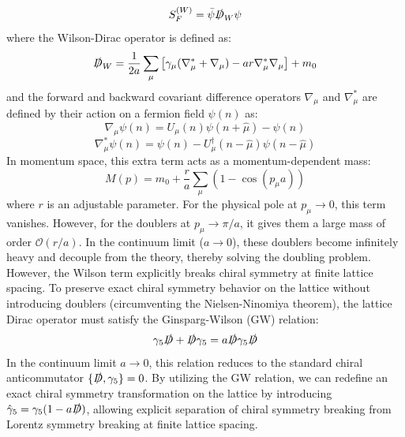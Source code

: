 \begin{equation}
S_F^{(W)} = \bar{\psi} \slashed{D}_W \psi
\label{eq:wilson_action}
\end{equation}
where the Wilson-Dirac operator is defined as:
\begin{equation}
\slashed{D}_W = \frac{1}{2a} \sum_\mu \left[ \gamma_\mu (\nabla_\mu^* + \nabla_\mu) - a r \nabla_\mu^* \nabla_\mu \right] + m_0
\label{eq:wilson_operator}
\end{equation}
and the forward and backward covariant difference operators $\nabla_\mu$ and $\nabla_\mu^*$ are defined by their action on a fermion field $\psi(n)$ as:
\begin{equation}
\nabla_\mu \psi(n) = U_\mu(n) \psi(n+\hat{\mu}) - \psi(n)
\label{eq:forward_covariant_diff}
\end{equation}
\begin{equation}
\nabla_\mu^* \psi(n) = \psi(n) - U_\mu^\dagger(n-\hat{\mu}) \psi(n-\hat{\mu})
\label{eq:backward_covariant_diff}
\end{equation}
In momentum space, this extra term acts as a momentum-dependent mass:
\begin{equation}
M(p) = m_0 + \frac{r}{a} \sum_\mu \left( 1 - \cos(p_\mu a) \right)
\label{eq:wilson_mass}
\end{equation}
where $r$ is an adjustable parameter. For the physical pole at $p_\mu \to 0$, this term vanishes. However, for the doublers at $p_\mu \to \pi/a$, it gives them a large mass of order $\mathcal{O}(r/a)$. In the continuum limit ($a \to 0$), these doublers become infinitely heavy and decouple from the theory, thereby solving the doubling problem. However, the Wilson term explicitly breaks chiral symmetry at finite lattice spacing. To preserve exact chiral symmetry behavior on the lattice without introducing doublers (circumventing the Nielsen-Ninomiya theorem), the lattice Dirac operator must satisfy the Ginsparg-Wilson (GW) relation:
\begin{equation}
\gamma_5 \slashed{D} + \slashed{D} \gamma_5 = a \slashed{D} \gamma_5 \slashed{D}
\label{eq:ginsparg_wilson}
\end{equation}
In the continuum limit $a \to 0$, this relation reduces to the standard chiral anticommutator $\{\slashed{D}, \gamma_5\} = 0$. By utilizing the GW relation, we can redefine an exact chiral symmetry transformation on the lattice by introducing $\hat{\gamma}_5 = \gamma_5(1-a\slashed{D})$, allowing explicit separation of chiral symmetry breaking from Lorentz symmetry breaking at finite lattice spacing.

